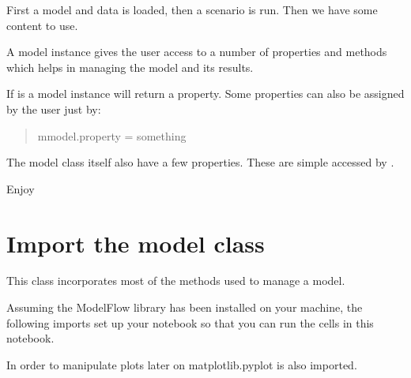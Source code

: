 \documentclass[letterpaper,10pt,english]{jupyterBook}
\begin{document}
\sphinxAtStartPar
First a model and data is loaded, then a scenario is run. Then we have some content to use.

\sphinxAtStartPar
A model instance gives the user access to a number of properties and methods which helps in managing the model and its results.

\sphinxAtStartPar
If  is a model instance  will return a property. Some properties can also be assigned by the user just by:
\begin{quote}

\sphinxAtStartPar
mmodel.property = something
\end{quote}

\sphinxAtStartPar
The model class itself also have a few properties. These are simple accessed by  .

\sphinxAtStartPar
Enjoy


\section{Import the model class}
\label{\detokenize{content/notebooks/modelflow_features:import-the-model-class}}
\sphinxAtStartPar
This class incorporates most of the methods used to manage a model.

\sphinxAtStartPar
Assuming the ModelFlow library has been installed on your machine, the following imports set up your notebook so that you can run the cells in this notebook.

\sphinxAtStartPar
In order to manipulate plots later on matplotlib.pyplot is also imported.
\end{document}
